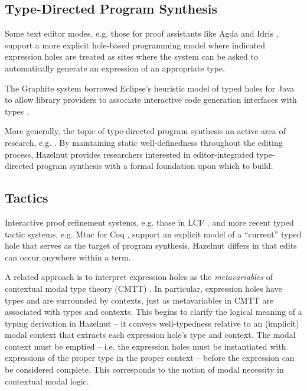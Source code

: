 \documentclass[9pt]{sigplanconf}
\begin{document}
\subsection{Type-Directed Program Synthesis}
Some text editor modes, e.g. those for proof assistants like
Agda \cite{norell:thesis} and Idris \cite{brady2013idris}, support a more
explicit hole-based programming model where indicated expression holes are
treated as sites where the system can be asked to automatically generate an
expression of an appropriate type. %

The Graphite system borrowed Eclipse's heuristic model of typed holes for Java to allow
library providers to associate interactive code generation interfaces with
types \cite{Omar:2012:ACC:2337223.2337324}.

More generally, the topic of type-directed program synthesis an active area
of research, e.g. \cite{DBLP:conf/pldi/OseraZ15}. By maintaining static
well-definedness throughout the editing process, Hazelnut provides
researchers interested in editor-integrated type-directed program synthesis
with a formal foundation upon which to build.

\subsection{Tactics}

Interactive proof refinement systems, e.g. those in LCF \cite{Gordon:1978:MIP:512760.512773}, and more recent typed tactic systems, e.g. Mtac for Coq \cite{Ziliani:2013:MMT:2544174.2500579}, 
support an explicit model of a ``current'' typed hole that serves as the 
target of program synthesis. Hazelnut differs in that edits can occur anywhere within a term.


A related approach is to interpret expression holes as the \emph{metavariables} of contextual modal type theory
(CMTT) \cite{DBLP:journals/tocl/NanevskiPP08}. In particular, expression
holes have types and are surrounded by contexts, just as metavariables in
CMTT are associated with types and contexts. This begins to clarify the
logical meaning of a typing derivation in Hazelnut -- it conveys
well-typedness relative to an (implicit) modal context that extracts each
expression hole's type and context. The modal context must be emptied --
i.e. the expression holes must be instantiated with expressions of the
proper type in the proper context -- before the expression can be
considered complete. This corresponds to the notion of modal necessity in
contextual modal logic.
\end{document}

